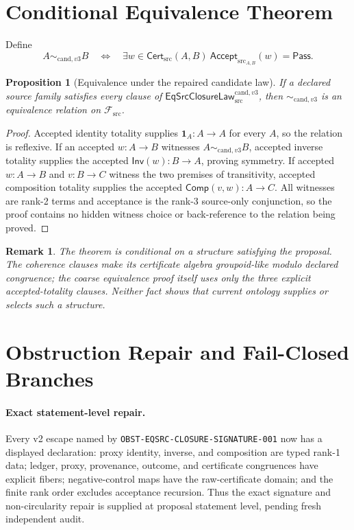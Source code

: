\documentclass[11pt]{article}
\newtheorem{proposition}{Proposition}
\newtheorem{remark}{Remark}
\newcommand{\Cert}{\mathsf{Cert}_{\mathrm{src}}}
\newcommand{\Accept}{\mathsf{Accept}_{\mathrm{src}}}
\newcommand{\Law}{\mathsf{EqSrcClosureLaw}^{\mathrm{cand},v3}_{\mathrm{src}}}
\newcommand{\Pass}{\mathsf{Pass}}
\begin{document}
\section{Conditional Equivalence Theorem}

Define
\[
 A\sim_{\mathrm{cand},v3}B
 \quad\Longleftrightarrow\quad
 \exists w\in\Cert(A,B)\ \Accept_{A,B}(w)=\Pass.
\]

\begin{proposition}[Equivalence under the repaired candidate law]
If a declared source family satisfies every clause of \(\Law\), then
\(\sim_{\mathrm{cand},v3}\) is an equivalence relation on
\(\mathcal F_{\mathrm{src}}\).
\end{proposition}

\begin{proof}
Accepted identity totality supplies \(\mathbf 1_A:A\to A\) for every \(A\),
so the relation is reflexive. If an accepted \(w:A\to B\) witnesses
\(A\sim_{\mathrm{cand},v3}B\), accepted inverse totality supplies the accepted
\(\mathsf{Inv}(w):B\to A\), proving symmetry. If accepted
\(w:A\to B\) and \(v:B\to C\) witness the two premises of transitivity,
accepted composition totality supplies the accepted
\(\mathsf{Comp}(v,w):A\to C\). All witnesses are rank-2 terms and acceptance
is the rank-3 source-only conjunction, so the proof contains no hidden witness
choice or back-reference to the relation being proved.
\end{proof}

\begin{remark}
The theorem is conditional on a structure satisfying the proposal. The
coherence clauses make its certificate algebra groupoid-like modulo declared
congruence; the coarse equivalence proof itself uses only the three explicit
accepted-totality clauses. Neither fact shows that current ontology supplies
or selects such a structure.
\end{remark}

\section{Obstruction Repair and Fail-Closed Branches}

\paragraph{Exact statement-level repair.}
Every v2 escape named by \texttt{OBST-EQSRC-CLOSURE-SIGNATURE-001} now has a
displayed declaration: proxy identity, inverse, and composition are typed
rank-1 data; ledger, proxy, provenance, outcome, and certificate congruences
have explicit fibers; negative-control maps have the raw-certificate domain;
and the finite rank order excludes acceptance recursion. Thus the exact
signature and non-circularity repair is supplied at proposal statement level,
pending fresh independent audit.
\end{document}
